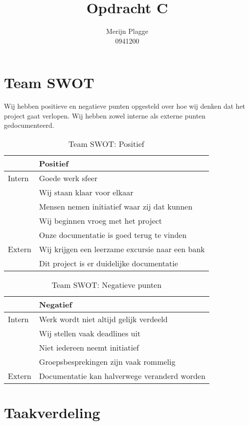 \documentclass{article}
\title{Opdracht C}
\author{Merijn Plagge \\ 0941200}
\begin{document}
\maketitle

\section{Team SWOT}

Wij hebben positieve en negatieve punten opgesteld over hoe wij denken dat het project gaat verlopen.
Wij hebben zowel interne als externe punten gedocumenteerd.

\begin{table}[h!]
\caption{Team SWOT: Positief}
\label{tab: Team SWOT: Positief}
\begin{tabular}{l|l}
        & \textbf{Positief} \\
        \hline
        {Intern} 	& Goede werk sfeer \\ 
			& Wij staan klaar voor elkaar \\
			& Mensen nemen initiatief waar zij dat kunnen \\
			& Wij beginnen vroeg met het project \\
			& Onze documentatie is goed terug te vinden \\
        {Extern}	& Wij krijgen een leerzame excursie naar een bank \\
			& Dit project is er duidelijke documentatie \\	
\end{tabular}
\end{table}

\begin{table}[h!]
\caption{Team SWOT: Negatieve punten}
\label{tab: Negatieve punten}
\begin{tabular}{l|l}
        & \textbf{Negatief}\\
        \hline
        {Intern} 	& Werk wordt niet altijd gelijk verdeeld \\
			& Wij stellen vaak deadlines uit \\
			& Niet iedereen neemt initiatief \\
			& Groepsbesprekingen zijn vaak rommelig \\
        {Extern}	& Documentatie kan halverwege veranderd worden\\
\end{tabular}
\end{table}


\newpage

\section{Taakverdeling}
\end{document}
